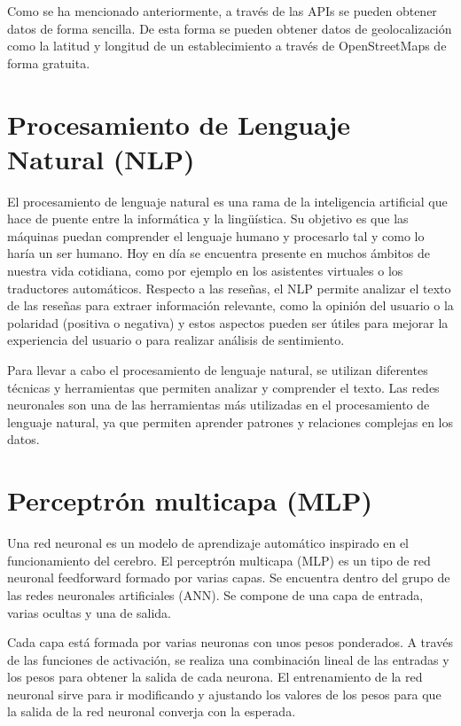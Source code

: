 Como se ha mencionado anteriormente, a través de las APIs se pueden obtener datos de forma sencilla.
De esta forma se pueden obtener datos de geolocalización como la latitud y longitud de un establecimiento a través de OpenStreetMaps de forma gratuita.

\section{Procesamiento de Lenguaje Natural (NLP)}

El procesamiento de lenguaje natural es una rama de la inteligencia artificial que hace de puente entre la informática y la lingüística. 
Su objetivo es que las máquinas puedan comprender el lenguaje humano y procesarlo tal y como lo haría un ser humano. \cite{udit:nlp}
Hoy en día se encuentra presente en muchos ámbitos de nuestra vida cotidiana, como por ejemplo en los asistentes virtuales o los traductores automáticos.
Respecto a las reseñas, el NLP permite analizar el texto de las reseñas para extraer información relevante, como la opinión del usuario o la polaridad (positiva o negativa) y estos aspectos pueden ser útiles para mejorar la experiencia del usuario o para realizar análisis de sentimiento.

Para llevar a cabo el procesamiento de lenguaje natural, se utilizan diferentes técnicas y herramientas que permiten analizar y comprender el texto.
Las redes neuronales son una de las herramientas más utilizadas en el procesamiento de lenguaje natural, ya que permiten aprender patrones y relaciones complejas en los datos.

\section{Perceptrón multicapa (MLP)}

Una red neuronal es un modelo de aprendizaje automático inspirado en el funcionamiento del cerebro. \cite{google:nn}
El perceptrón multicapa (MLP) es un tipo de red neuronal feedforward formado por varias capas.
Se encuentra dentro del grupo de las redes neuronales artificiales (ANN).
Se compone de una capa de entrada, varias ocultas y una de salida.


Cada capa está formada por varias neuronas con unos pesos ponderados.
A través de las funciones de activación, se realiza una combinación lineal de las entradas y los pesos para obtener la salida de cada neurona.
El entrenamiento de la red neuronal sirve para ir modificando y ajustando los valores de los pesos para que la salida de la red neuronal converja con la esperada.


